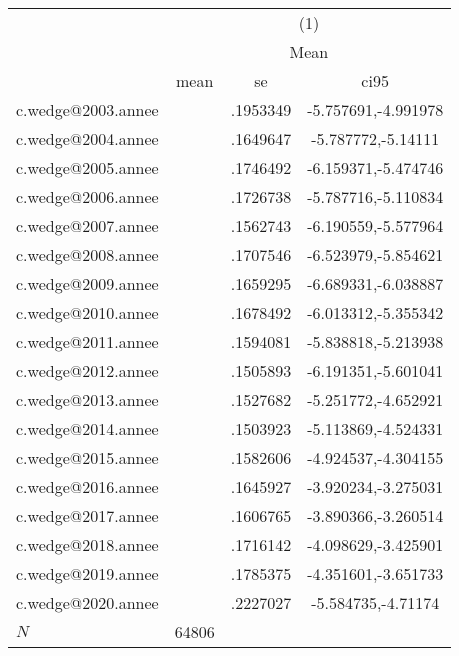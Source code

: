 {
\def\sym#1{\ifmmode^{#1}\else\(^{#1}\)\fi}
\begin{tabular}{l*{1}{ccc}}
\hline\hline
            &\multicolumn{3}{c}{(1)}               \\
            &\multicolumn{3}{c}{Mean}              \\
            &        mean&          se&        ci95\\
\hline
c.wedge@2003.annee&            &    .1953349&-5.757691,-4.991978\\
c.wedge@2004.annee&            &    .1649647&-5.787772,-5.14111\\
c.wedge@2005.annee&            &    .1746492&-6.159371,-5.474746\\
c.wedge@2006.annee&            &    .1726738&-5.787716,-5.110834\\
c.wedge@2007.annee&            &    .1562743&-6.190559,-5.577964\\
c.wedge@2008.annee&            &    .1707546&-6.523979,-5.854621\\
c.wedge@2009.annee&            &    .1659295&-6.689331,-6.038887\\
c.wedge@2010.annee&            &    .1678492&-6.013312,-5.355342\\
c.wedge@2011.annee&            &    .1594081&-5.838818,-5.213938\\
c.wedge@2012.annee&            &    .1505893&-6.191351,-5.601041\\
c.wedge@2013.annee&            &    .1527682&-5.251772,-4.652921\\
c.wedge@2014.annee&            &    .1503923&-5.113869,-4.524331\\
c.wedge@2015.annee&            &    .1582606&-4.924537,-4.304155\\
c.wedge@2016.annee&            &    .1645927&-3.920234,-3.275031\\
c.wedge@2017.annee&            &    .1606765&-3.890366,-3.260514\\
c.wedge@2018.annee&            &    .1716142&-4.098629,-3.425901\\
c.wedge@2019.annee&            &    .1785375&-4.351601,-3.651733\\
c.wedge@2020.annee&            &    .2227027&-5.584735,-4.71174\\
\hline
\(N\)       &       64806&            &            \\
\hline\hline
\end{tabular}
}
